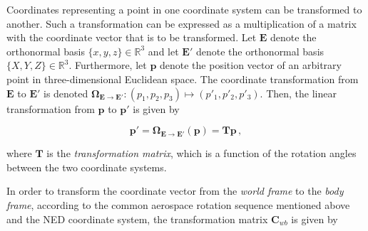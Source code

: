 Coordinates representing a point in one coordinate system can be transformed to another. Such a transformation can be expressed as a multiplication of a matrix with the coordinate vector that is to be transformed. Let $\mathbf{E}$ denote the orthonormal basis $\{x, y, z\} \in \mathbb{R}^3$ and let $\mathbf{E}'$ denote the orthonormal basis $\{X, Y, Z\} \in \mathbb{R}^3$. Furthermore, let $\mathbf{p}$ denote the position vector of an arbitrary point in three-dimensional Euclidean space. The coordinate transformation from $\mathbf{E}$ to $\mathbf{E}'$ is denoted $\bm{\Omega}_{\mathbf{E} \rightarrow \mathbf{E}'}: (p_1, p_2, p_3) \mapsto (p'_1, p'_2, p'_3)$. Then, the linear transformation from $\mathbf{p}$ to $\mathbf{p}'$ is given by

\begin{equation}\label{eq:transformation}
  \mathbf{p'} = \bm{\Omega}_{\mathbf{E} \rightarrow \mathbf{E}'}(\mathbf{p}) = \mathbf{T} \mathbf{p}\,,
\end{equation}

\noindent
where $\mathbf{T}$ is the \emph{transformation matrix}, which is a function of the rotation angles between the two coordinate systems.

In order to transform the coordinate vector from the \emph{world frame} to the \emph{body frame}, according to the common aerospace rotation sequence mentioned above and the \gls{NED} coordinate system, the transformation matrix $\mathbf{C}_{wb}$ is given by

